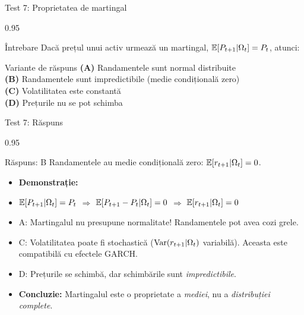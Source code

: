 \documentclass[9pt, aspectratio=169, t]{beamer}
\begin{document}
\begin{frame}{Test 7: Proprietatea de martingal}
\begin{cminipage}{0.95\textwidth}
    \begin{alertblock}{Întrebare}
        Dacă prețul unui activ urmează un martingal, $\mathbb{E}[P_{t+1}|\Omega_t] = P_t$, atunci:
    \end{alertblock}

    \vspace{0.5cm}
    \begin{block}{Variante de răspuns}
    \textcolor{MainBlue}{\textbf{(A)}} Randamentele sunt normal distribuite\\[3pt]
    \textcolor{MainBlue}{\textbf{(B)}} Randamentele sunt impredictibile (medie condițională zero)\\[3pt]
    \textcolor{MainBlue}{\textbf{(C)}} Volatilitatea este constantă\\[3pt]
    \textcolor{MainBlue}{\textbf{(D)}} Prețurile nu se pot schimba
    \end{block}
\end{cminipage}
\end{frame}

\begin{frame}{Test 7: Răspuns}
\begin{cminipage}{0.95\textwidth}
    \begin{exampleblock}{Răspuns: B}
        Randamentele au medie condițională zero: $\mathbb{E}[r_{t+1}|\Omega_t] = 0$.
    \end{exampleblock}

    \vspace{0.2cm}

    \begin{itemize}\setlength{\itemsep}{0pt}
        \item \textbf{Demonstrație:}
        \item $\mathbb{E}[P_{t+1}|\Omega_t] = P_t$ $\Rightarrow$ $\mathbb{E}[P_{t+1} - P_t|\Omega_t] = 0$ $\Rightarrow$ $\mathbb{E}[r_{t+1}|\Omega_t] = 0$
        \item A: \incorrect{} Martingalul nu presupune normalitate! Randamentele pot avea cozi grele.
        \item C: \incorrect{} Volatilitatea poate fi stochastică ($\text{Var}(r_{t+1}|\Omega_t)$ variabilă). Aceasta este compatibilă cu efectele GARCH.
        \item D: \incorrect{} Prețurile se schimbă, dar schimbările sunt \textit{impredictibile}.
        \item \textbf{Concluzie:} Martingalul este o proprietate a \textit{mediei}, nu a \textit{distribuției complete}.
    \end{itemize}
\end{cminipage}
\end{frame}
\end{document}

